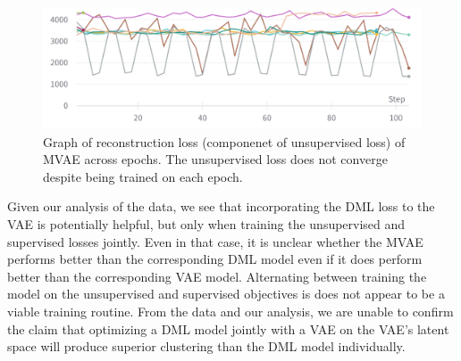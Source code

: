 \documentclass[./dissertation.tex]{subfiles}
\begin{document}
    \begin{figure}
        \centering
        \includegraphics[width=.96\textwidth]{figures/recon_loss_convergence_cropped.png}
        \caption{Graph of reconstruction loss (componenet of unsupervised loss) of MVAE across epochs. The unsupervised loss does not converge despite being trained on each epoch.}
        \label{fig:my_label}
    \end{figure}
    
    Given our analysis of the data, we see that incorporating the DML loss to the VAE is potentially helpful, but only when training the unsupervised and supervised losses jointly. Even in that case, it is unclear whether the MVAE performs better than the corresponding DML model even if it does perform better than the corresponding VAE model. Alternating between training the model on the unsupervised and supervised objectives is does not appear to be a viable training routine. From the data and our analysis, we are unable to confirm the claim that optimizing a DML model jointly with a VAE on the VAE’s latent space will produce superior clustering than the DML model individually.
    
\end{document}
